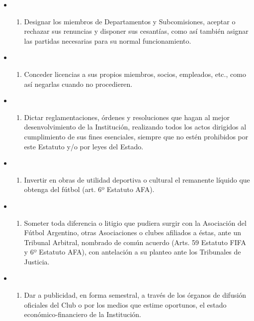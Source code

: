 \documentclass[]{book}
\providecommand{\tightlist}{%
  \setlength{\itemsep}{0pt}\setlength{\parskip}{0pt}}
\begin{document}
\begin{itemize}
\begin{itemize}
\begin{enumerate}
    \end{enumerate}
  \item
    \begin{enumerate}
    \def\labelenumi{\alph{enumi})}
    \setcounter{enumi}{19}
    \tightlist
    \item
      Designar los miembros de Departamentos y Subcomisiones, aceptar o rechazar sus renuncias y disponer sus cesantías, como así también asignar las partidas necesarias para su normal funcionamiento.
    \end{enumerate}
  \item
    \begin{enumerate}
    \def\labelenumi{\alph{enumi})}
    \setcounter{enumi}{20}
    \tightlist
    \item
      Conceder licencias a sus propios miembros, socios, empleados, etc., como así negarlas cuando no procedieren.
    \end{enumerate}
  \item
    \begin{enumerate}
    \def\labelenumi{\alph{enumi})}
    \setcounter{enumi}{21}
    \tightlist
    \item
      Dictar reglamentaciones, órdenes y resoluciones que hagan al mejor desenvolvimiento de la Institución, realizando todos los actos dirigidos al cumplimiento de sus fines esenciales, siempre que no estén prohibidos por este Estatuto y/o por leyes del Estado.
    \end{enumerate}
  \item
    \begin{enumerate}
    \def\labelenumi{\alph{enumi})}
    \setcounter{enumi}{22}
    \tightlist
    \item
      Invertir en obras de utilidad deportiva o cultural el remanente líquido que obtenga del fútbol (art. 6º Estatuto AFA).
    \end{enumerate}
  \item
    \begin{enumerate}
    \def\labelenumi{\alph{enumi})}
    \setcounter{enumi}{23}
    \tightlist
    \item
      Someter toda diferencia o litigio que pudiera surgir con la Asociación del Fútbol Argentino, otras Asociaciones o clubes afiliados a éstas, ante un Tribunal Arbitral, nombrado de común acuerdo (Arts. 59 Estatuto FIFA y 6º Estatuto AFA), con antelación a su planteo ante los Tribunales de Justicia.
    \end{enumerate}
  \item
    \begin{enumerate}
    \def\labelenumi{\alph{enumi})}
    \setcounter{enumi}{24}
    \tightlist
    \item
      Dar a publicidad, en forma semestral, a través de los órganos de difusión oficiales del Club o por los medios que estime oportunos, el estado económico-financiero de la Institución.
    \end{enumerate}
  \end{itemize}
\end{itemize}
\end{document}

